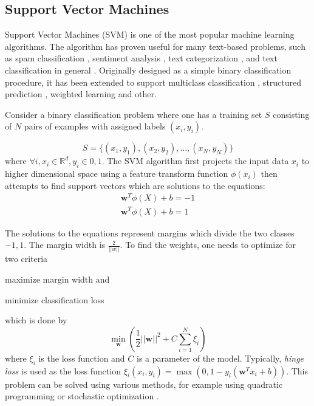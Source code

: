 \subsection{Support Vector Machines}
\label{sec:svm}

Support Vector Machines (SVM) \citep{cortes1995support} is one of the most
popular machine learning algorithms. The algorithm has proven useful for many
text-based problems, such as spam classification \citep{drucker1999support},
sentiment analysis \citep{wang2012baselines}, text categorization
\citep{joachims1998text}, and text classification in general
\citep{tong2001support, ikonomakis2005text}. Originally designed as a simple
binary classification procedure, it has been extended to support multiclass
classification \citep{weston1998multi}, structured prediction
\citep{tsochantaridis2005large}, weighted learning \citep{huang2005weighted} and
other. 

Consider a binary classification problem where one has
a training set $S$ consisting of $N$ pairs of examples with assigned labels
$(x_i, y_i)$.

$$
S = \{(x_1, y_1), (x_2, y_2), \dots, (x_N, y_N)\}
$$
where $\forall i, x_i \in \mathbb{R}^d, y_i \in {0, 1}$.
The SVM algorithm first projects the input data $x_i$ to 
higher dimensional space using a 
feature transform function $\phi(x_i)$ then attempts to 
find support vectors which are solutions to the equations:
\begin{align*}
\textbf{w}^T \phi(X) + b = -1 \\
\textbf{w}^T \phi(X) + b = 1
\end{align*}

The solutions to the equations represent margins which divide the two classes
${-1, 1}$.  The margin width is $\frac{2}{||w||}$.  To find the weights, one
needs to optimize for two criteria 
\begin{enumerate*}[label=(\arabic*)]
\item maximize margin width and
\item minimize classification loss
\end{enumerate*} which is done by
$$
\min_{\textbf{w}} \left( \frac{1}{2}||\textbf{w}||^2 + C \sum_{i=1}^{N} \xi_i \right)
$$
where $\xi_i$ is the loss function and $C$ is a parameter of the model.
Typically, \textit{hinge loss} is used as the loss function $\xi_i(x_i, y_i) =
\max(0, 1 - y_i(\textbf{w}^T x_i + b))$. This problem can be solved using
various methods, for example using quadratic programming \citep{wu2005svm} or
stochastic optimization \citep{wang2012breaking}.

